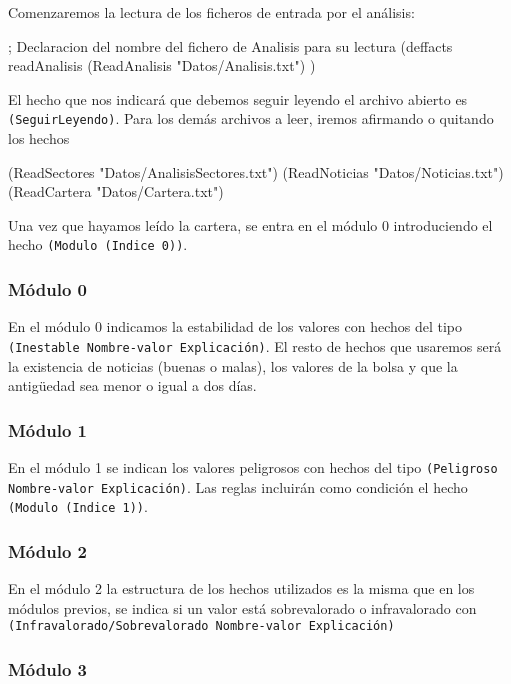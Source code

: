 \documentclass[11pt,leqno]{article}
\theoremstyle{definition_wo_parentheses}
\theoremstyle{plain}
\theoremstyle{remark}
\begin{document}
Comenzaremos la lectura de los ficheros de entrada por el análisis: 

\begin{clips-code}
; Declaracion del nombre del fichero de Analisis para su lectura
(deffacts readAnalisis
  (ReadAnalisis "Datos/Analisis.txt")
)
\end{clips-code}

El hecho que nos indicará que debemos seguir leyendo el archivo abierto es \texttt{(SeguirLeyendo)}. Para los demás archivos a leer, iremos afirmando o quitando los hechos

\begin{clips-code}
(ReadSectores "Datos/AnalisisSectores.txt")
(ReadNoticias "Datos/Noticias.txt")
(ReadCartera "Datos/Cartera.txt")
\end{clips-code}

Una vez que hayamos leído la cartera, se entra en el módulo 0 introduciendo el hecho \texttt{(Modulo (Indice 0))}.

\subsubsection{Módulo 0}

En el módulo 0 indicamos la estabilidad de los valores con hechos del tipo \texttt{(Inestable Nombre-valor Explicación)}. El resto  de hechos que usaremos será la existencia de noticias (buenas o malas), los valores de la bolsa y que la antigüedad sea menor o igual a dos días. 

\subsubsection{Módulo 1}

En el módulo 1 se indican los valores peligrosos con hechos del tipo \texttt{(Peligroso Nombre-valor Explicación)}. Las reglas incluirán como condición el hecho \texttt{(Modulo (Indice 1))}.

\subsubsection{Módulo 2}

En el módulo 2 la estructura de los hechos utilizados es la misma que en los módulos previos, se indica si un valor está sobrevalorado o infravalorado con \texttt{(Infravalorado/Sobrevalorado Nombre-valor Explicación)}

\subsubsection{Módulo 3}
\end{document}
